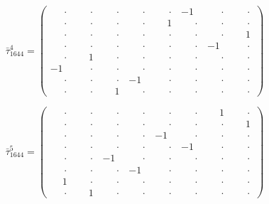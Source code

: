 \documentclass[
  10pt,
]{article}
\begin{document}
\[
\bar\tau_{1644}^{4} = \left(\begin{array}{rrrr|rrrr}
\phantom{-}\cdot & \phantom{-}\cdot & \phantom{-}\cdot & \phantom{-}\cdot & \phantom{-}\cdot & -1 & \phantom{-}\cdot & \phantom{-}\cdot \\[-1.8pt]
\phantom{-}\cdot & \phantom{-}\cdot & \phantom{-}\cdot & \phantom{-}\cdot & \phantom{-}1 & \phantom{-}\cdot & \phantom{-}\cdot & \phantom{-}\cdot \\[-1.8pt]
\phantom{-}\cdot & \phantom{-}\cdot & \phantom{-}\cdot & \phantom{-}\cdot & \phantom{-}\cdot & \phantom{-}\cdot & \phantom{-}\cdot & \phantom{-}1 \\[-1.8pt]
\phantom{-}\cdot & \phantom{-}\cdot & \phantom{-}\cdot & \phantom{-}\cdot & \phantom{-}\cdot & \phantom{-}\cdot & -1 & \phantom{-}\cdot \\[-1.8pt]
\hline
\phantom{-}\cdot & \phantom{-}1 & \phantom{-}\cdot & \phantom{-}\cdot & \phantom{-}\cdot & \phantom{-}\cdot & \phantom{-}\cdot & \phantom{-}\cdot \\[-1.8pt]
-1 & \phantom{-}\cdot & \phantom{-}\cdot & \phantom{-}\cdot & \phantom{-}\cdot & \phantom{-}\cdot & \phantom{-}\cdot & \phantom{-}\cdot \\[-1.8pt]
\phantom{-}\cdot & \phantom{-}\cdot & \phantom{-}\cdot & -1 & \phantom{-}\cdot & \phantom{-}\cdot & \phantom{-}\cdot & \phantom{-}\cdot \\[-1.8pt]
\phantom{-}\cdot & \phantom{-}\cdot & \phantom{-}1 & \phantom{-}\cdot & \phantom{-}\cdot & \phantom{-}\cdot & \phantom{-}\cdot & \phantom{-}\cdot
\end{array}\right)
\]

\[
\bar\tau_{1644}^{5} = \left(\begin{array}{rrrr|rrrr}
\phantom{-}\cdot & \phantom{-}\cdot & \phantom{-}\cdot & \phantom{-}\cdot & \phantom{-}\cdot & \phantom{-}\cdot & \phantom{-}1 & \phantom{-}\cdot \\[-1.8pt]
\phantom{-}\cdot & \phantom{-}\cdot & \phantom{-}\cdot & \phantom{-}\cdot & \phantom{-}\cdot & \phantom{-}\cdot & \phantom{-}\cdot & \phantom{-}1 \\[-1.8pt]
\phantom{-}\cdot & \phantom{-}\cdot & \phantom{-}\cdot & \phantom{-}\cdot & -1 & \phantom{-}\cdot & \phantom{-}\cdot & \phantom{-}\cdot \\[-1.8pt]
\phantom{-}\cdot & \phantom{-}\cdot & \phantom{-}\cdot & \phantom{-}\cdot & \phantom{-}\cdot & -1 & \phantom{-}\cdot & \phantom{-}\cdot \\[-1.8pt]
\hline
\phantom{-}\cdot & \phantom{-}\cdot & -1 & \phantom{-}\cdot & \phantom{-}\cdot & \phantom{-}\cdot & \phantom{-}\cdot & \phantom{-}\cdot \\[-1.8pt]
\phantom{-}\cdot & \phantom{-}\cdot & \phantom{-}\cdot & -1 & \phantom{-}\cdot & \phantom{-}\cdot & \phantom{-}\cdot & \phantom{-}\cdot \\[-1.8pt]
\phantom{-}1 & \phantom{-}\cdot & \phantom{-}\cdot & \phantom{-}\cdot & \phantom{-}\cdot & \phantom{-}\cdot & \phantom{-}\cdot & \phantom{-}\cdot \\[-1.8pt]
\phantom{-}\cdot & \phantom{-}1 & \phantom{-}\cdot & \phantom{-}\cdot & \phantom{-}\cdot & \phantom{-}\cdot & \phantom{-}\cdot & \phantom{-}\cdot
\end{array}\right)
\]
\end{document}
